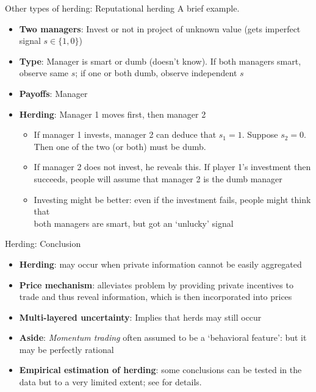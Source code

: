 \documentclass[english,10pt
,aspectratio=169
]{beamer}
\begin{document}
\begin{frame}{Other types of herding: Reputational herding}
	A brief example.
	\begin{itemize}
		\item \textbf{Two  managers}: Invest or not in project of unknown value (gets imperfect signal $s \in \{1,0\}$)
		\item \textbf{Type}: Manager is smart or dumb (doesn't know). If both managers smart, observe same $s$; if one or both dumb, observe independent $s$ %
		\item \textbf{Payoffs}:  Manager 
		\item \textbf{Herding}: Manager 1 moves first, then manager 2 
		\begin{itemize}
			\item If manager 1 invests, manager 2 can deduce that $s_1=1$. Suppose $s_2=0$. 
			\\ Then one of the two (or both) must be dumb. 
			\item If manager 2 does not invest, he reveals this. If player 1's investment then 
			\\succeeds, people will assume that manager 2 is the dumb manager
			\item Investing might be better: even if the investment fails, people might think that 
			\\both managers are smart, but got an `unlucky' signal
		\end{itemize}
	\end{itemize}
\end{frame}


\begin{frame}{Herding: Conclusion}
	\begin{itemize}
		\item \textbf{Herding}: may occur when private information cannot be easily aggregated
		\item \textbf{Price mechanism}: alleviates problem by providing private incentives to trade and thus reveal information, which is then incorporated into prices
		\item \textbf{Multi-layered uncertainty}: Implies that herds may still occur 
		\item \textbf{Aside}: \emph{Momentum trading} often assumed to be a `behavioral feature': but it may be perfectly rational
		\item \textbf{Empirical estimation of herding}: some conclusions can be tested in the data but to a very limited extent; see \cite{bikhchandani_herd_2000} for details.
	\end{itemize}
\end{frame}
\end{document}

